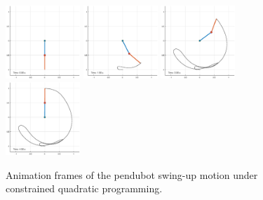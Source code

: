 \begin{figure}[H]
    \centering
    \includegraphics[width=0.25\textwidth,trim={3cm 1cm 1cm 1cm},clip]{assets/pendubot_qp_anim_1.eps} \hspace*{-0.5cm}
    \includegraphics[width=0.25\textwidth,trim={3cm 1cm 1cm 1cm},clip]{assets/pendubot_qp_anim_2.eps} \hspace*{-0.5cm}
    \includegraphics[width=0.25\textwidth,trim={3cm 1cm 1cm 1cm},clip]{assets/pendubot_qp_anim_3.eps} \hspace*{-0.5cm}
    \includegraphics[width=0.25\textwidth,trim={3cm 1cm 1cm 1cm},clip]{assets/pendubot_qp_anim_4.eps}
    \caption{Animation frames of the pendubot swing-up motion under constrained quadratic programming.}
    \label{fig:pendubot_anim}
\end{figure}
